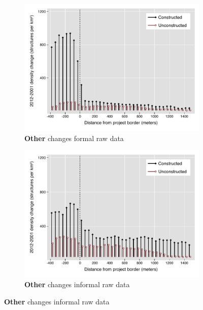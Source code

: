 \documentclass[12pt]{article}
\begin{document}
\begin{figure}
\begin{subfigure}[b]{0.48\textwidth}
        \end{subfigure}
        \begin{subfigure}[b]{0.48\textwidth}
                    \caption[Network2]%
            {{\footnotesize \textbf{Other} changes formal raw data}}   
            \label{fig:prefor}
            \centering
            \includegraphics[width=\textwidth,trim={0.3cm .3cm 0.1cm 0cm}, clip=true]{figures/bblu_for_rawchanges_4_3_spk.pdf}

        \end{subfigure}
        \hfill
        \begin{subfigure}[b]{0.48\textwidth} 
                    \caption[]%
            {{\footnotesize \textbf{Other} changes informal  raw data}}      
            \label{fig:preinf} 
            \centering 
            \includegraphics[width=\textwidth,trim={0.3cm .3cm 0.1cm 0cm}, clip=true]{figures/bblu_inf_rawchanges_4_3_spk.pdf}

        \end{subfigure}
\end{figure}
\end{document}
